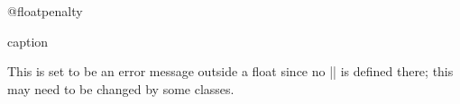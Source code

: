 %
%
%
%
 \begin{docCommand}{@floatpenalty}{}
    \begin{teX}
\newcount\@floatpenalty
    \end{teX}
 \end{docCommand}
%
%
 \begin{docCommand}{caption}{}

    This is set to be an error message outside a float since no
    |\@captype| is defined there; this may need to be changed by some 
    classes.

    \begin{teX}
\def\caption{%
   \ifx\@captype\@undefined
     \@latex@error{\noexpand\caption outside float}\@ehd
     \expandafter\@gobble
   \else
     \refstepcounter\@captype
     \expandafter\@firstofone
   \fi
   {\@dblarg{\@caption\@captype}}%
} 
    \end{teX}
 \end{docCommand}
%
